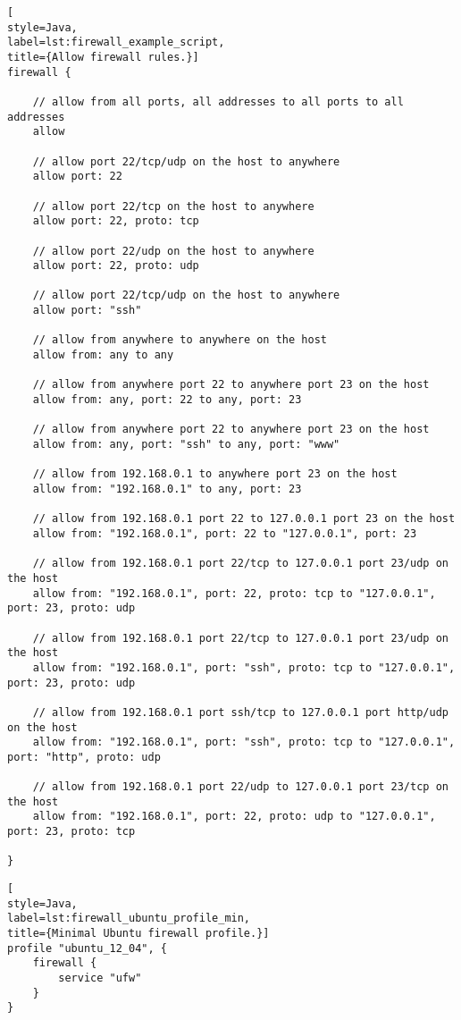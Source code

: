 \begin{lstlisting}[
style=Java,
label=lst:firewall_example_script,
title={Allow firewall rules.}]
firewall {

    // allow from all ports, all addresses to all ports to all addresses
    allow

    // allow port 22/tcp/udp on the host to anywhere
    allow port: 22

    // allow port 22/tcp on the host to anywhere
    allow port: 22, proto: tcp

    // allow port 22/udp on the host to anywhere
    allow port: 22, proto: udp

    // allow port 22/tcp/udp on the host to anywhere
    allow port: "ssh"

    // allow from anywhere to anywhere on the host
    allow from: any to any

    // allow from anywhere port 22 to anywhere port 23 on the host
    allow from: any, port: 22 to any, port: 23

    // allow from anywhere port 22 to anywhere port 23 on the host
    allow from: any, port: "ssh" to any, port: "www"

    // allow from 192.168.0.1 to anywhere port 23 on the host
    allow from: "192.168.0.1" to any, port: 23

    // allow from 192.168.0.1 port 22 to 127.0.0.1 port 23 on the host
    allow from: "192.168.0.1", port: 22 to "127.0.0.1", port: 23

    // allow from 192.168.0.1 port 22/tcp to 127.0.0.1 port 23/udp on the host
    allow from: "192.168.0.1", port: 22, proto: tcp to "127.0.0.1", port: 23, proto: udp

    // allow from 192.168.0.1 port 22/tcp to 127.0.0.1 port 23/udp on the host
    allow from: "192.168.0.1", port: "ssh", proto: tcp to "127.0.0.1", port: 23, proto: udp

    // allow from 192.168.0.1 port ssh/tcp to 127.0.0.1 port http/udp on the host
    allow from: "192.168.0.1", port: "ssh", proto: tcp to "127.0.0.1", port: "http", proto: udp

    // allow from 192.168.0.1 port 22/udp to 127.0.0.1 port 23/tcp on the host
    allow from: "192.168.0.1", port: 22, proto: udp to "127.0.0.1", port: 23, proto: tcp

}
\end{lstlisting}

\begin{lstlisting}[
style=Java,
label=lst:firewall_ubuntu_profile_min,
title={Minimal Ubuntu firewall profile.}]
profile "ubuntu_12_04", {
    firewall {
        service "ufw"
    }
}
\end{lstlisting}

